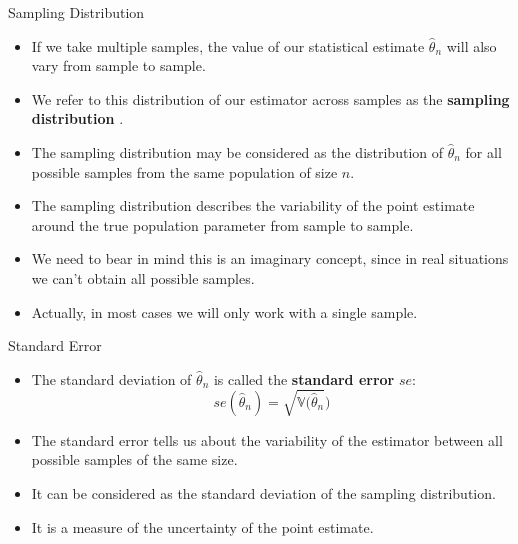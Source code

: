 \documentclass[handout]{beamer}
\begin{document}
\begin{frame}{Sampling Distribution}

\scriptsize{

\begin{itemize}
\item If we take multiple samples, the value of our statistical estimate $\hat{\theta}_n$ will also vary from sample to sample.

\item We refer to this distribution of our estimator across samples as the   \textbf{sampling distribution} \cite{poldrack2019statistical}.

\item The sampling distribution may be considered as the distribution of  $\hat{\theta}_n$ for all possible samples from the same population of size $n$.

\item The sampling distribution describes the variability of the point estimate around the true population parameter from sample to sample. 

\item We need to bear in mind this is an imaginary concept, since in real situations we can't obtain all possible samples.

\item Actually, in most cases we will only work with a single sample.

\end{itemize}

} 
\end{frame}


\begin{frame}{Standard Error}

\scriptsize{

\begin{itemize}
\item The standard deviation of $\hat{\theta}_n$ is called the \textbf{standard error} $se$:
\begin{displaymath}
se(\hat{\theta}_n)=\sqrt{\mathbb{V}(\hat{\theta}_n})
\end{displaymath}
\item The standard error tells us about the variability of the estimator between all possible samples of the same size.
\item It can be considered as the standard deviation of the sampling distribution. 
\item It is a measure of the uncertainty of the point estimate.
\end{itemize}

} 
\end{frame}
\end{document}
